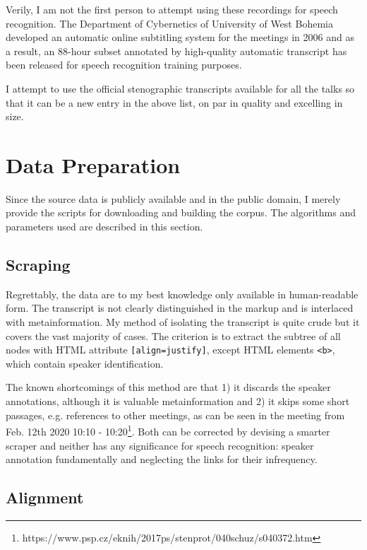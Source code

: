 \documentclass[conference]{IEEEtran}
\begin{document}
Verily, I am not the first person to attempt using these recordings for speech
recognition. The Department of Cybernetics of University of West Bohemia
developed an automatic online subtitling system for the meetings in
2006\cite{pspsubs} and as a result, an 88-hour subset annotated by high-quality
automatic transcript has been released for speech recognition training
purposes\cite{pspdata}.

I attempt to use the official stenographic transcripts available for all the
talks so that it can be a new entry in the above list, on par in quality and
excelling in size.

\section{Data Preparation}

Since the source data is publicly available and in the public domain, I merely
provide the scripts for downloading and building the corpus. The algorithms and
parameters used are described in this section.

\subsection{Scraping}

Regrettably, the data are to my best knowledge only available in human-readable
form. The transcript is not clearly distinguished in the markup and is
interlaced with metainformation. My method of isolating the transcript is quite
crude but it covers the vast majority of cases. The criterion is to extract the
subtree of all nodes with HTML attribute \texttt{[align=justify]}, except HTML
elements \texttt{<b>}, which contain speaker identification.

The known shortcomings of this method are that 1) it discards the speaker
annotations, although it is valuable metainformation and 2) it skips some short
passages, e.g. references to other meetings, as can be seen in the meeting
from Feb. 12th 2020 10:10 -
10:20\footnote{https://www.psp.cz/eknih/2017ps/stenprot/040schuz/s040372.htm}.
Both can be corrected by devising a smarter scraper and neither has any
significance for speech recognition: speaker annotation fundamentally and
neglecting the links for their infrequency.

\subsection{Alignment}
\end{document}
